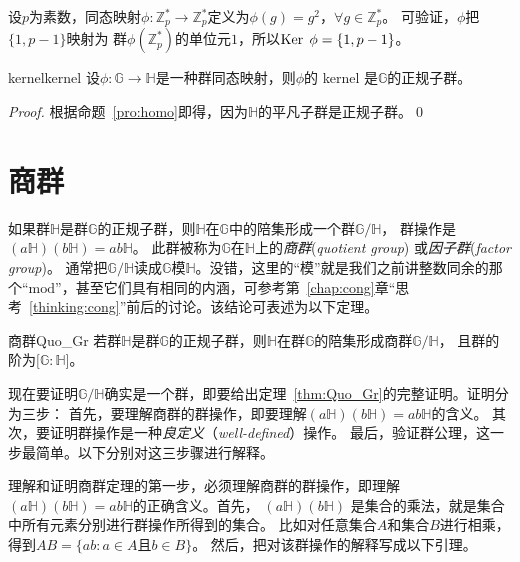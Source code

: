 	\begin{example}
	        设$p$为素数，同态映射$\phi\colon \mathbb{Z}_p^* \to \mathbb{Z}_p^*$定义为$\phi(g) = g^2$，$\forall g\in\mathbb{Z}_p^*$。
	        可验证，$\phi $把$\{1, p-1\}$映射为
	        群$\phi(\mathbb{Z}_p^*)$的单位元$1$，所以$\operatorname{Ker}\; \phi = \{1, p-1\}$。
	\end{example}
	
		\begin{proposition}{kernel}{kernel}
			设$\phi\colon \mathbb{G} \to \mathbb{H}$是一种群同态映射，则$\phi$的 kernel 是$\mathbb{G}$的正规子群。
	\end{proposition}
	
	\begin{proof}
		 根据命题~\ref{pro:homo}即得，因为$\mathbb{H}$的平凡子群是正规子群。\qed
	\end{proof}

\section{商群}
\label{sec:quotient_gr}
如果群$\mathbb{H}$是群$\mathbb{G}$的正规子群，则$\mathbb{H}$在$\mathbb{G}$中的陪集形成一个群$\mathbb{G}/ \mathbb{H}$，
群操作是$(a \mathbb{H}) (b \mathbb{H}) = ab \mathbb{H}$。
此群被称为$\mathbb{G}$在$\mathbb{H}$上的\emph{商群}(\emph{quotient group}) 
或\emph{因子群}(\emph{factor group})。
通常把$\mathbb{G}/ \mathbb{H}$读成$\mathbb{G}$模$\mathbb{H}$。没错，这里的“模”就是我们之前讲整数同余的那个“$\text{mod}$”，甚至它们具有相同的内涵，可参考第~\ref{chap:cong}章“思考~\ref{thinking:cong}”前后的讨论。该结论可表述为以下定理。

\begin{theorem}{商群}{Quo_Gr}
若群$\mathbb{H}$是群$\mathbb{G}$的正规子群，则$\mathbb{H}$在群$\mathbb{G}$的陪集形成商群$\mathbb{G}/ \mathbb{H}$，
且群的阶为$\lbrack \mathbb{G}: \mathbb{H}\rbrack$。
\end{theorem}

现在要证明$\mathbb{G}/ \mathbb{H}$确实是一个群，即要给出定理~\ref{thm:Quo_Gr}的完整证明。证明分为三步：
首先，要理解商群的群操作，即要理解$(a \mathbb{H}) (b \mathbb{H}) = ab \mathbb{H}$的含义。
其次，要证明群操作是一种\emph{良定义}（\emph{well-defined}）操作。
最后，验证群公理，这一步最简单。以下分别对这三步骤进行解释。

理解和证明商群定理的第一步，必须理解商群的群操作，即理解
$(a \mathbb{H}) (b \mathbb{H}) = ab \mathbb{H}$的正确含义。首先，
$(a \mathbb{H}) (b \mathbb{H}) $
是集合的乘法，就是集合中所有元素分别进行群操作所得到的集合。
比如对任意集合$A$和集合$B$进行相乘，得到$AB = \{a b :  a \in A \text{且}  b \in B\}$。
然后，把对该群操作的解释写成以下引理。

